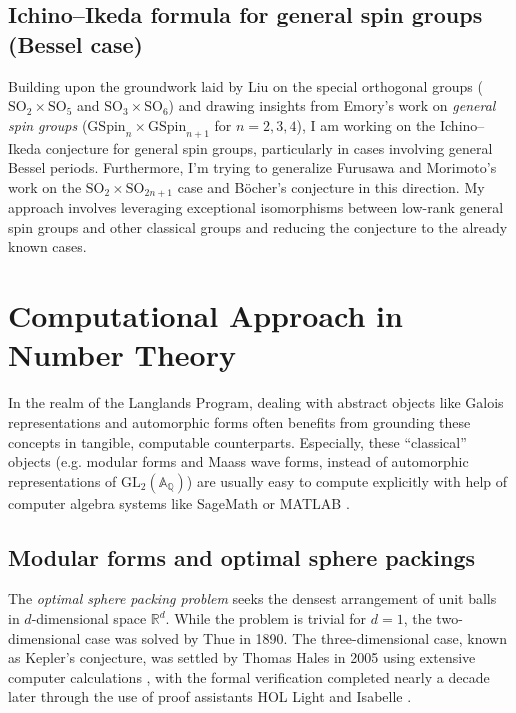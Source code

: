 \documentclass[12pt]{article}
\begin{document}
\subsection*{Ichino--Ikeda formula for general spin groups (Bessel case)}

Building upon the groundwork laid by Liu \cite{liu2016refined} on the special orthogonal groups ($\mathrm{SO}_{2} \times \mathrm{SO}_{5}$ and $\mathrm{SO}_{3} \times \mathrm{SO}_{6}$) and drawing insights from Emory's work \cite{emory2020global} on \emph{general spin groups} ($\mathrm{GSpin}_{n} \times \mathrm{GSpin}_{n+1}$ for $n = 2, 3, 4$), I am working on the Ichino--Ikeda conjecture for general spin groups, particularly in cases involving general Bessel periods.
Furthermore, I'm trying to generalize Furusawa and Morimoto's work on the $\mathrm{SO}_{2} \times \mathrm{SO}_{2n+1}$ case and B\"ocher's conjecture \cite{furusawa2020refined} in this direction.
My approach involves leveraging exceptional isomorphisms between low-rank general spin groups and other classical groups and reducing the conjecture to the already known cases.


\section*{Computational Approach in Number Theory}

In the realm of the Langlands Program, dealing with abstract objects like Galois representations and automorphic forms often benefits from grounding these concepts in tangible, computable counterparts.
Especially, these ``classical'' objects (e.g. modular forms and Maass wave forms, instead of automorphic representations of $\mathrm{GL}_{2}(\mathbb{A}_{\mathbb{Q}})$) are usually easy to compute explicitly with help of computer algebra systems like SageMath \cite{sagemath} or MATLAB \cite{MATLAB}.


\subsection*{Modular forms and optimal sphere packings}

The \emph{optimal sphere packing problem} seeks the densest arrangement of unit balls in $d$-dimensional space $\mathbb{R}^{d}$.
While the problem is trivial for $d = 1$, the two-dimensional case was solved by Thue in 1890.
The three-dimensional case, known as Kepler's conjecture, was settled by Thomas Hales in 2005 using extensive computer calculations \cite{hales2005proof}, with the formal verification completed nearly a decade later through the use of proof assistants HOL Light and Isabelle \cite{hales2017formal}.
\end{document}
